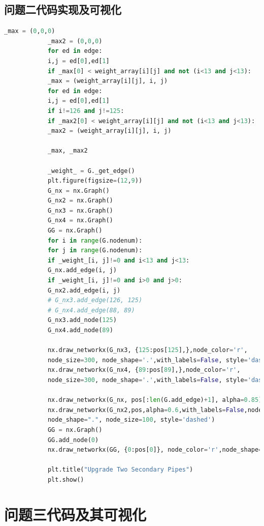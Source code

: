 \documentclass{whutmod}
\begin{document}
		\subsection*{问题二代码实现及可视化}
			\begin{lstlisting}[language=python]
			_max = (0,0,0)
			_max2 = (0,0,0)
			for ed in edge:
			i,j = ed[0],ed[1]
			if _max[0] < weight_array[i][j] and not (i<13 and j<13):
			_max = (weight_array[i][j], i, j)
			for ed in edge:
			i,j = ed[0],ed[1]
			if i!=126 and j!=125:
			if _max2[0] < weight_array[i][j] and not (i<13 and j<13):
			_max2 = (weight_array[i][j], i, j)
			
			_max, _max2
			
			_weight_ = G._get_edge()
			plt.figure(figsize=(12,9)) 
			G_nx = nx.Graph()
			G_nx2 = nx.Graph()
			G_nx3 = nx.Graph()
			G_nx4 = nx.Graph()
			GG = nx.Graph()
			for i in range(G.nodenum):
			for j in range(G.nodenum):
			if _weight_[i, j]!=0 and i<13 and j<13:
			G_nx.add_edge(i, j)
			if _weight_[i, j]!=0 and i>0 and j>0:
			G_nx2.add_edge(i, j)
			# G_nx3.add_edge(126, 125)
			# G_nx4.add_edge(88, 89)
			G_nx3.add_node(125)
			G_nx4.add_node(89)
			
			nx.draw_networkx(G_nx3, {125:pos[125],},node_color='r',
			node_size=300, node_shape='.',with_labels=False, style='dashed')
			nx.draw_networkx(G_nx4, {89:pos[89],},node_color='r',
			node_size=300, node_shape='.',with_labels=False, style='dashed')
			
			nx.draw_networkx(G_nx, pos[:len(G.add_edge)+1], alpha=0.85)
			nx.draw_networkx(G_nx2,pos,alpha=0.6,with_labels=False,node_color='slateblue',
			node_shape=".", node_size=100, style='dashed')
			GG = nx.Graph()
			GG.add_node(0)
			nx.draw_networkx(GG, {0:pos[0]}, node_color='r',node_shape='*', node_size=1200)
			
			plt.title("Upgrade Two Secondary Pipes")
			plt.show() 
			\end{lstlisting}
			
		\section{问题三代码及其可视化}
			\begin{lstlisting}[language=python]

			\end{lstlisting}
\end{document}

